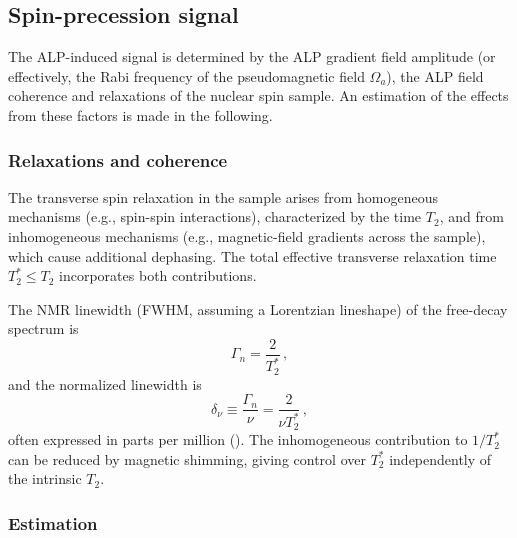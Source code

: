 \subsection{Spin-precession signal}\label{sec:theory:signal}

The ALP-induced signal is determined by the ALP gradient field amplitude (or effectively, the Rabi frequency of the pseudomagnetic field $\Omega_a$), the ALP field coherence and relaxations of the nuclear spin sample.
An estimation of the effects from these factors is made in the following.


\subsubsection{Relaxations and coherence}\label{sec:theory:relaxations}
The transverse spin relaxation in the sample arises from homogeneous mechanisms (e.g., spin-spin interactions), characterized by the time $T_2$, and from inhomogeneous mechanisms (e.g., magnetic-field gradients across the sample), which cause additional dephasing.
The total effective transverse relaxation time $T_2^* \leq T_2$ incorporates both contributions.

The NMR linewidth (FWHM, assuming a Lorentzian lineshape) of the free-decay spectrum is
\begin{equation}
    \Gamma_{n} = \dfrac{2}{T_2^*}
    \,,\label{eq:Gamma_n}
\end{equation}
and the normalized linewidth is
\begin{equation}
    \delta_\nu \equiv \dfrac{\Gamma_{n}}{\nu} = \dfrac{2}{\nu T_2^*}
    \,,\label{eq:delta_nu}
\end{equation}
often expressed in parts per million (\SI{}{\ppm}).
The inhomogeneous contribution to $1/T_2^*$ can be reduced by magnetic shimming, giving control over $T_2^*$ independently of the intrinsic $T_2$.


\subsubsection{Estimation}\label{sec:theory:estimation}

